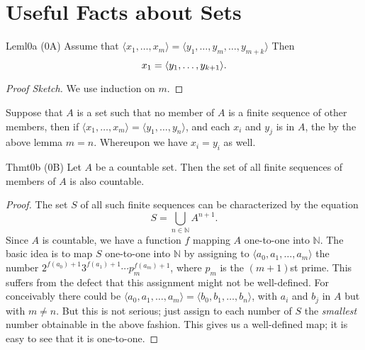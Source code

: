 \chapter{Useful Facts about Sets}

\begin{reference}{Lem}{l0a}
  (0A) Assume that
  $
    \langle x_1,\dots,x_m\rangle=\langle y_1,\dots,y_m,\dots,y_{m+k}\rangle
  $
  Then
  \[x_1=\langle y_1,\dots,y_{k+1}\rangle.\qedhere\]
\end{reference}
\begin{proof}[Proof Sketch]
  We use induction on $m$.
\end{proof}

Suppose that $A$ is a set such that no member of $A$ is a finite sequence of other members, then if $\langle x_1,\dots,x_m\rangle=\langle y_1,\dots,y_n\rangle$, and each $x_i$ and $y_j$ is in $A$, the by the above lemma $m=n$. Whereupon we have $x_i=y_i$ as well.

\begin{reference}{Thm}{t0b}
  (0B) Let $A$ be a countable set. Then the set of all finite sequences of members of $A$ is also countable.
\end{reference}
\begin{proof}[Proof]
  The set $S$ of all such finite sequences can be characterized by the equation
  \[
    S=\bigcup_{n\in\mathbb{N}}A^{n+1}.
  \]
  Since $A$ is countable, we have a function $f$ mapping $A$ one-to-one into $\mathbb{N}$. The basic idea is to map $S$ one-to-one into $\mathbb{N}$ by assigning to $\langle a_0,a_1,\dots,a_m\rangle$ the number $2^{f(a_0)+1}3^{f(a_1)+1}\cdots p_m^{f(a_m)+1}$, where $p_m$ is the $(m+1)$st prime. This suffers from the defect that this assignment might not be well-defined. For conceivably there could be $\langle a_0,a_1,\dots,a_m\rangle=\langle b_0,b_1,\dots,b_n\rangle$, with $a_i$ and $b_j$ in $A$ but with $m\neq n$. But this is not serious; just assign to each number of $S$ the \textit{smallest} number obtainable in the above fashion. This gives us a well-defined map; it is easy to see that it is one-to-one.
\end{proof}
